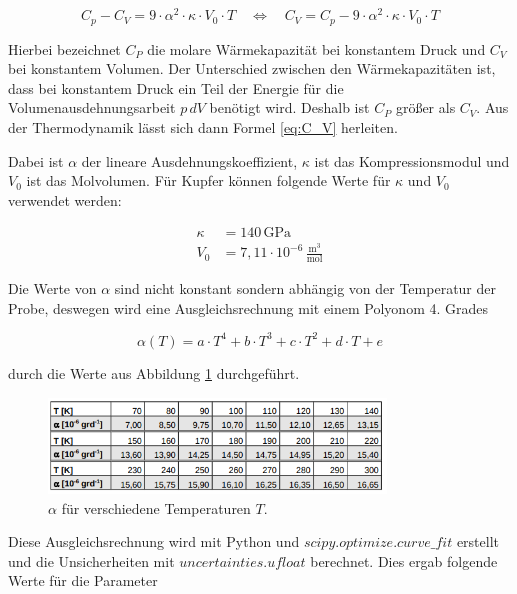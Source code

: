 \begin{equation}
    C_p - C_V = 9 \cdot \alpha^2 \cdot \kappa \cdot V_0 \cdot T \, \, \, \, \, \, \Leftrightarrow \, \, \, \, \, \, C_V = C_p - 9 \cdot \alpha^2 \cdot \kappa \cdot V_0 \cdot T
    \label{eq:C_V}
\end{equation}

Hierbei bezeichnet $C_P$ die molare Wärmekapazität bei konstantem Druck und $C_V$ bei konstantem Volumen. Der Unterschied zwischen den Wärmekapazitäten ist, dass bei konstantem Druck ein Teil der Energie für die Volumenausdehnungsarbeit $p \, dV$ benötigt wird. Deshalb ist $C_P$ größer als $C_V$. Aus der Thermodynamik lässt sich dann Formel \eqref{eq:C_V} herleiten. 

Dabei ist $\alpha$ der lineare Ausdehnungskoeffizient, $\kappa$ \cite{kappa} ist das Kompressionsmodul und $V_0$ \cite{V0} ist das Molvolumen. Für Kupfer können folgende Werte für $\kappa$ und $V_0$ verwendet werden:

\begin{align*}
    \kappa &= 140 \, \mathrm{GPa} \\
    V_0 &= 7, \! 11 \cdot 10^{-6} \, \frac{\mathrm{m}^3}{\mathrm{mol}}
\end{align*}

Die Werte von $\alpha$ sind nicht konstant sondern abhängig von der Temperatur der Probe, deswegen wird eine Ausgleichsrechnung mit einem Polyonom 4. Grades

\begin{equation}
    \alpha (T) = a \cdot T^4 + b \cdot T^3 + c \cdot T^2 + d \cdot T + e
    \label{eq:alpha}
\end{equation}

durch die Werte aus Abbildung \ref{fig:alpha} durchgeführt.

\begin{figure}
    \centering
    \includegraphics[width=0.8\textwidth]{build/alpha.PNG}
    \caption{$\alpha$ für verschiedene Temperaturen $T$. \cite{Anleitung}}
    \label{fig:alpha}
\end{figure}

Diese Ausgleichsrechnung wird mit Python und $scipy.optimize.curve\_fit$ erstellt und die Unsicherheiten mit $uncertainties.ufloat$ berechnet. Dies ergab folgende Werte für die Parameter

